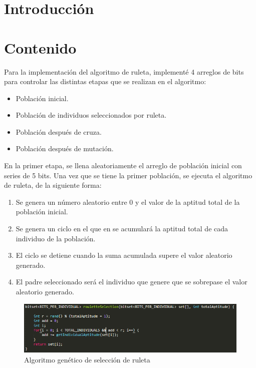 \documentclass[11pt,letterpaper]{article}
\begin{document}


\section*{Introducción}


\section*{Contenido}
Para la implementación del algoritmo de ruleta, implementé 4 arreglos de bits para controlar las distintas etapas que se realizan en el algoritmo:
\begin{itemize}
	\item Población inicial.
	\item Población de individuos seleccionados por ruleta.
	\item Población después de cruza.
	\item Población después de mutación.
\end{itemize}

En la primer etapa, se llena aleatoriamente el arreglo de población inicial con series de 5 bits. Una vez que se tiene la primer población, se ejecuta el algoritmo de ruleta, de la siguiente forma:

\begin{enumerate}
	\item Se genera un número aleatorio entre 0 y el valor de la aptitud total de la población inicial.
	\item Se genera un ciclo en el que en se acumulará la aptitud total de cada individuo de la población.
	\item El ciclo se detiene cuando la suma acumulada supere el valor aleatorio generado.
	\item El padre seleccionado será el individuo que genere que se sobrepase el valor aleatorio generado. 
\end{enumerate}

\begin{figure}[H]
	\centering
	\includegraphics[scale = 1]{images/ruleta}
	\caption{Algoritmo genético de selección de ruleta}
\end{figure}
\end{document}
